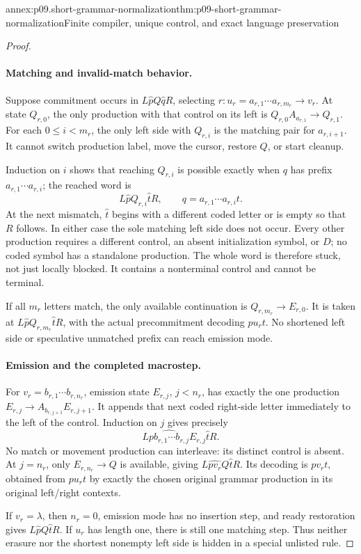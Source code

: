 \begin{annexitem}{annex:p09.short-grammar-normalization}{thm:p09-short-grammar-normalization}{Finite compiler, unique control, and exact language preservation}
\begin{proof}
\paragraph{Matching and invalid-match behavior.}
Suppose commitment occurs in \(L\widehat pQ\widehat qR\), selecting
\(r:u_r=a_{r,1}\cdots a_{r,m_r}\to v_r\).
At state \(Q_{r,0}\), the only production with that control on its left
is \(Q_{r,0}A_{a_{r,1}}\to Q_{r,1}\).
For each \(0\leq i<m_r\), the only left side with \(Q_{r,i}\) is the
matching pair for \(a_{r,i+1}\). It cannot switch production label,
move the cursor, restore \(Q\), or start cleanup.

Induction on \(i\) shows that reaching \(Q_{r,i}\) is possible exactly
when \(q\) has prefix \(a_{r,1}\cdots a_{r,i}\); the reached word is
\[
 L\widehat pQ_{r,i}\widehat tR,
 \qquad q=a_{r,1}\cdots a_{r,i}t.
\]
At the next mismatch, \(\widehat t\) begins with a different coded letter
or is empty so that \(R\) follows. In either case the sole matching left
side does not occur. Every other production requires a different control,
an absent initialization symbol, or \(D\); no coded symbol has a standalone
production. The whole word is therefore stuck, not just locally blocked.
It contains a nonterminal control and cannot be terminal.

If all \(m_r\) letters match, the only available continuation is
\(Q_{r,m_r}\to E_{r,0}\). It is taken at
\(L\widehat pQ_{r,m_r}\widehat tR\), with the actual precommitment
decoding \(pu_rt\). No shortened left side or speculative unmatched
prefix can reach emission mode.

\paragraph{Emission and the completed macrostep.}
For \(v_r=b_{r,1}\cdots b_{r,n_r}\), emission state \(E_{r,j}\),
\(j<n_r\), has exactly the one production
\(E_{r,j}\to A_{b_{r,j+1}}E_{r,j+1}\).
It appends that next coded right-side letter immediately to the left
of the control. Induction on \(j\) gives precisely
\[
 L\widehat{pb_{r,1}\cdots b_{r,j}}E_{r,j}\widehat tR.
\]
No match or movement production can interleave: its distinct control is
absent. At \(j=n_r\), only \(E_{r,n_r}\to Q\) is available, giving
\(L\widehat{pv_r}Q\widehat tR\).
Its decoding is \(pv_rt\), obtained from \(pu_rt\) by exactly the
chosen original grammar production in its original left/right contexts.

If \(v_r=\lambda\), then \(n_r=0\), emission mode has no insertion
step, and ready restoration gives \(L\widehat pQ\widehat tR\).
If \(u_r\) has length one, there is still one matching step.
Thus neither erasure nor the shortest nonempty left side is hidden in a
special unlisted rule.


\end{proof}
\end{annexitem}
